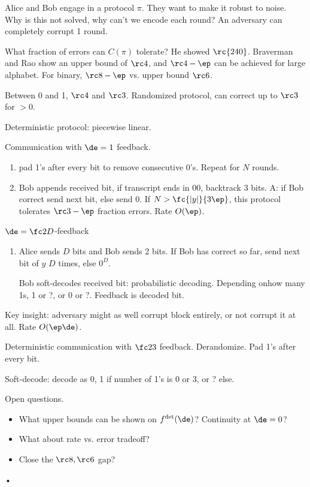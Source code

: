 Alice and Bob engage in a protocol $\pi$. They want to make it robust to noise. Why is this not solved, why can't we encode each round? An adversary can completely corrupt 1 round.

What fraction of errors can $C(\pi)$ tolerate? He showed $\rc{240}$. Braverman and Rao show an upper bound of $\rc4$, and $\rc4-\ep$ can be achieved for large alphabet. For binary, $\rc8-\ep$ vs. upper bound $\rc6$.

Between 0 and 1, $\rc4$ and $\rc3$. 
Randomized protocol, can correct up to $\rc3$ for $>0$.

Deterministic protocol: piecewise linear.

Communication with $\de=1$ feedback.
\begin{enumerate}
\item
pad 1's after every bit to remove consecutive 0's. Repeat for $N$ rounds. 
\item
Bob appends received bit, if transcript ends in 00, backtrack 3 bits. 
A: if Bob correct send next bit, else send 0.
If $N>\fc{|y|}{3\ep}$, this protocol tolerates $\rc3-\ep$ fraction errors. Rate $O(\ep)$.
\end{enumerate}
$\de=\fc2D$-feedback
\begin{enumerate}
\item
Alice sends $D$ bits and Bob sends 2 bits. 
If Bob has correct so far, send next bit of $y$ $D$ times, else $0^D$. 

Bob soft-decodes received bit: probabilistic decoding. Depending onhow many 1s, 1 or ?, or 0 or ?. 
Feedback is decoded bit.

\end{enumerate}
Key insight: adversary might as well corrupt block entirely, or not corrupt it at all. Rate $O(\ep\de)$.

Deterministic communication with $\fc23$ feedback.
Derandomize. Pad 1's after every bit.

Soft-decode: decode as 0, 1 if number of 1's is 0 or 3, or ? else.

Open questions.
\begin{itemize}
\item
What upper bounds can be shown on $f^{\det}(\de)$? Continuity at $\de=0$?
\item
What about rate vs. error tradeoff?
\item
Close the $\rc8,\rc6$ gap?
\end{itemize}•

